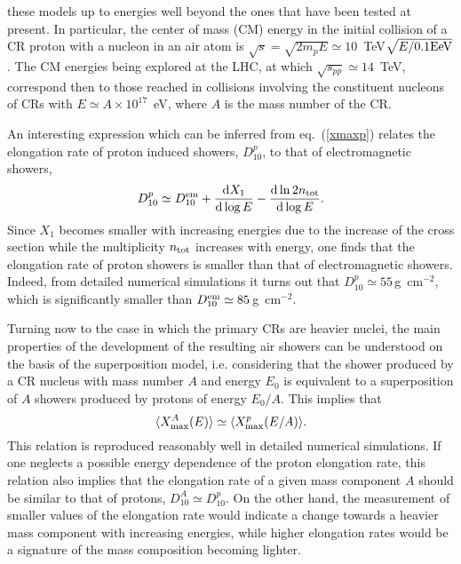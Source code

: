 \documentclass[twoside,12pt]{article}
\newcommand{\be}{\begin{equation}}
\newcommand{\ee}{\end{equation}}
\begin{document}
these models up to energies well beyond the ones that have been tested at present. In particular, the center of mass (CM)  energy in the initial collision of a CR proton with a nucleon in an air atom is $\sqrt{s}=\sqrt{2m_pE}\simeq 10$~TeV$\sqrt{E/0.1{\rm EeV}}$. The CM energies being explored at the LHC, at which $\sqrt{s_{pp}}\simeq 14$~TeV, correspond then to those reached in  collisions involving the constituent nucleons of CRs with $E\simeq A\times 10^{17}$~eV, where $A$ is the mass number of the CR.

An interesting expression which can be inferred from eq.~(\ref{xmaxp}) relates the elongation rate of proton induced showers, $D_{10}^p$, to that of electromagnetic showers,
\be 
D_{10}^p\simeq D_{10}^{\rm em}+\frac{{\rm d}X_1}{{\rm d}\log E}-\frac{{\rm d}\ln 2n_{\rm tot}}{{\rm d}\log E}.
\ee 
Since $X_1$ becomes smaller with increasing energies due to the increase of the cross section while the multiplicity $n_{\rm tot}$ increases with energy, one finds that the elongation rate of proton showers is smaller than that of electromagnetic showers. Indeed, from detailed numerical simulations it turns out that $D_{10}^p\simeq 55$\,g~cm$^{-2}$, which is significantly smaller than $D_{10}^{\rm em}\simeq 85$\,g~cm$^{-2}$.


Turning now to the case in which the primary CRs are heavier nuclei, the main properties of the development of the resulting air showers can be understood on the basis of the superposition model, i.e. considering that the shower produced by a CR nucleus with mass number $A$ and energy $E_0$ is equivalent to a superposition of $A$ showers produced by protons of energy $E_0/A$. This  implies that
\be 
\langle X_{\rm max}^A(E)\rangle \simeq \langle X_{\rm max}^p(E/A)\rangle .
\ee 
This relation is reproduced reasonably well in detailed numerical simulations. If one neglects a possible energy dependence of the proton elongation rate, this relation also implies that the elongation rate of a given mass component $A$ should be similar to that of protons, $D_{10}^A\simeq D_{10}^p$. On the other hand, the measurement of smaller  values of the elongation rate would indicate a change towards a heavier mass component with increasing energies, while higher elongation rates would be a signature of the mass composition becoming lighter.
\end{document}
